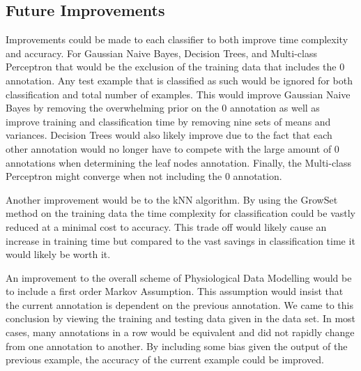 \documentclass[twoside]{article}
\begin{document}
\begin{multicols}{2}
\section{Future Improvements}
Improvements could be made to each classifier to both improve time complexity and accuracy.  For Gaussian Naive Bayes, Decision Trees, and Multi-class Perceptron that would be the exclusion of the training data that includes the $0$ annotation.  Any test example that is classified as such would be ignored for both classification and total number of examples.  This would improve Gaussian Naive Bayes by removing the overwhelming prior on the $0$ annotation as well as improve training and classification time by removing nine sets of means and variances.  Decision Trees would also likely improve due to the fact that each other annotation would no longer have to compete with the large amount of $0$ annotations when determining the leaf nodes annotation.  Finally, the Multi-class Perceptron might converge when not including the $0$ annotation.

Another improvement would be to the kNN algorithm.  By using the GrowSet method on the training data the time complexity for classification could be vastly reduced at a minimal cost to accuracy.  This trade off would likely cause an increase in training time but compared to the vast savings in classification time it would likely be worth it.

An improvement to the overall scheme of Physiological Data Modelling would be to include a first order Markov Assumption.  This assumption would insist that the current annotation is dependent on the previous annotation.  We came to this conclusion by viewing the training and testing data given in the data set.  In most cases, many annotations in a row would be equivalent and did not rapidly change from one annotation to another.  By including some bias given the output of the previous example, the accuracy of the current example could be improved.


\end{multicols}
\end{document}
